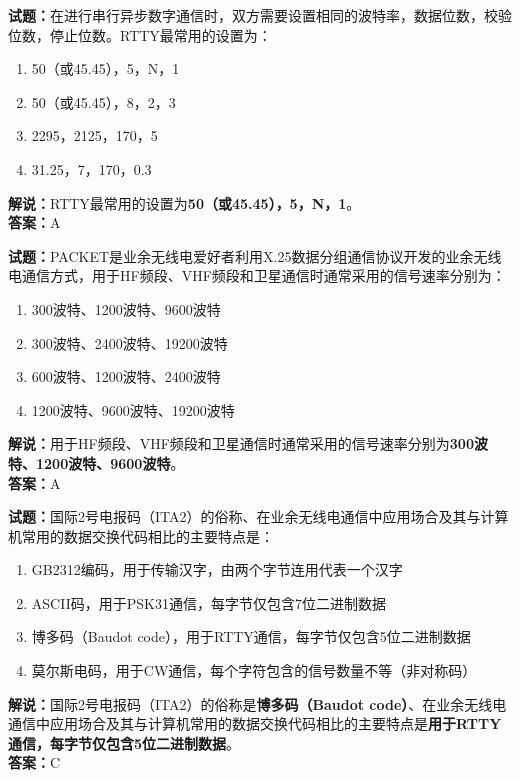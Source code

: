 \documentclass{ctexbook}
\begin{document}
\noindent\textbf{试题：}在进行串行异步数字通信时，双方需要设置相同的波特率，数据位数，校验位数，停止位数。RTTY最常用的设置为：
\begin{enumerate}[leftmargin=3em]
\item 50（或45.45），5，N，1
\item 50（或45.45），8，2，3
\item 2295，2125，170，5
\item 31.25，7，170，0.3
\end{enumerate}
\noindent\textbf{解说：}RTTY最常用的设置为\textbf{50（或45.45），5，N，1}。\\\noindent\textbf{答案：}A



\bigskip


\noindent\textbf{试题：}PACKET是业余无线电爱好者利用X.25数据分组通信协议开发的业余无线电通信方式，用于HF频段、VHF频段和卫星通信时通常采用的信号速率分别为：
\begin{enumerate}[leftmargin=3em]
\item 300波特、1200波特、9600波特
\item 300波特、2400波特、19200波特
\item 600波特、1200波特、2400波特
\item 1200波特、9600波特、19200波特
\end{enumerate}
\noindent\textbf{解说：}用于HF频段、VHF频段和卫星通信时通常采用的信号速率分别为\textbf{300波特、1200波特、9600波特}。\\\noindent\textbf{答案：}A



\bigskip


\noindent\textbf{试题：}国际2号电报码（ITA2）的俗称、在业余无线电通信中应用场合及其与计算机常用的数据交换代码相比的主要特点是：
\begin{enumerate}[leftmargin=3em]
\item GB2312编码，用于传输汉字，由两个字节连用代表一个汉字
\item ASCII码，用于PSK31通信，每字节仅包含7位二进制数据
\item 博多码（Baudot code），用于RTTY通信，每字节仅包含5位二进制数据
\item 莫尔斯电码，用于CW通信，每个字符包含的信号数量不等（非对称码）
\end{enumerate}
\noindent\textbf{解说：}国际2号电报码（ITA2）的俗称是\textbf{博多码（Baudot code）}、在业余无线电通信中应用场合及其与计算机常用的数据交换代码相比的主要特点是\textbf{用于RTTY通信，每字节仅包含5位二进制数据}。\\\noindent\textbf{答案：}C
\end{document}
